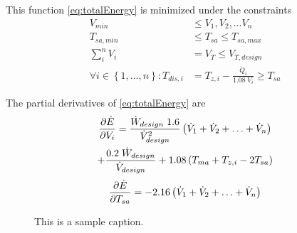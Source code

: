 This function \ref{eq:totalEnergy} is minimized under the constraints
\begin{align}
V_{min}&\leq V_1, V_2, \ldots V_n \\
T_{sa,min}&\leq T_{sa} \leq T_{sa,max} \\
\sum_i^n V_i &= V_T \leq V_{T,design} \\
\forall i\in\left\{1,\ldots,n\right\}: T_{dis,i} &= T_{z,i} - \frac{\dot{Q}_i}{1.08\;V_i} \geq T_{sa}
\end{align}

The partial derivatives of \ref{eq:totalEnergy} are 
\begin{multline}
\pdv{\dot{E}}{V_i}=\frac{\dot{W}_{design}\;1.6}{\dot{V}_{design}^2} \left(\dot{V}_{1}+\dot{V}_{2}+\ldots+\dot{V}_{n} \right)\\ 
+\frac{0.2\;\dot{W}_{design}}{\dot{V}_{design}}+ 1.08\left(T_{ma}+T_{z,i} -2T_{sa}\right)
\end{multline}
\begin{equation}
\pdv{\dot{E}}{T_{sa}}=-2.16\left(\dot{V}_{1}+\dot{V}_{2}+\ldots+\dot{V}_{n} \right)
\end{equation}


\begin{figure}
\centering
{}
\caption{This is a sample caption.}
\end{figure}






%
%
%
%
%
%
%
%



























